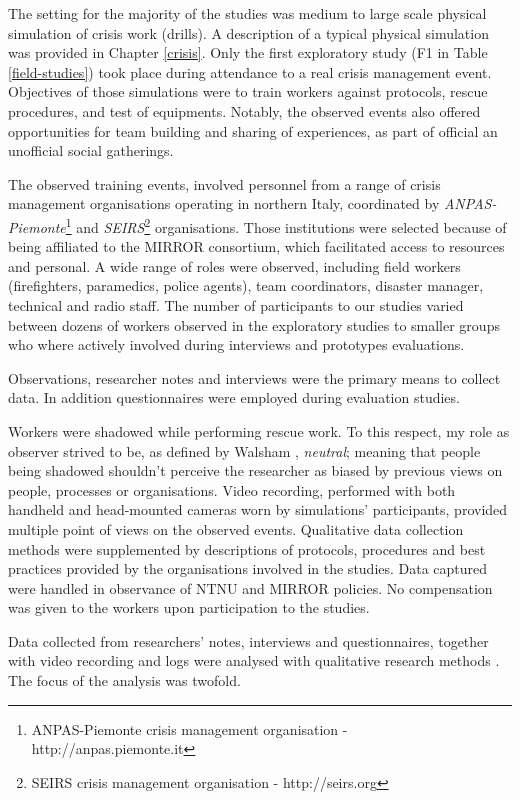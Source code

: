 The setting for the majority of the studies was medium to large scale physical simulation of crisis work (drills). A description of a typical physical simulation was provided in Chapter \ref{crisis}. Only the first exploratory study (F1 in Table \ref{field-studies}) took place during attendance to a real crisis management event. Objectives of those simulations were to train workers against protocols, rescue procedures, and test of equipments. Notably, the observed events also offered opportunities for team building and sharing of experiences, as part of official an unofficial social gatherings.

The observed training events, involved personnel from a range of crisis management organisations operating in northern Italy, coordinated by \emph{ANPAS-Piemonte}\footnote{ANPAS-Piemonte crisis management organisation - http://anpas.piemonte.it} and \emph{SEIRS}\footnote{SEIRS crisis management organisation - http://seirs.org} organisations. Those institutions were selected because of being affiliated to the MIRROR consortium, which facilitated access to resources and personal. A wide range of roles were observed, including field workers (firefighters, paramedics, police agents), team coordinators, disaster manager, technical and radio staff. The number of participants to our studies varied between dozens of workers observed in the exploratory studies to smaller groups who where actively involved during interviews and prototypes evaluations.

Observations, researcher notes and interviews were the primary means to collect data. In addition questionnaires were employed during evaluation studies.

Workers were shadowed while performing rescue work. To this respect, my role as observer strived to be, as defined by Walsham \autocite*{Walsham:2006bo}, \emph{neutral}; meaning that people being shadowed shouldn't perceive the researcher as biased by previous views on people, processes or organisations. Video recording, performed with both handheld and head-mounted cameras worn by simulations' participants, provided multiple point of views on the observed events. Qualitative data collection methods were supplemented by descriptions of protocols, procedures and best practices provided by the organisations involved in the studies. Data captured were handled in observance of NTNU and MIRROR policies. No compensation was given to the workers upon participation to the studies.

Data collected from researchers' notes, interviews and questionnaires, together with video recording and logs were analysed with qualitative research methods \autocite{robson1993real}. The focus of the analysis was twofold.

